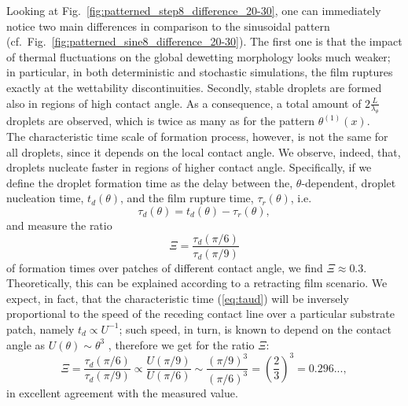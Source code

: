 Looking at Fig.~\ref{fig:patterned_step8_difference_20-30}, one can immediately notice two main differences in comparison to the sinusoidal pattern (cf.~Fig.~\ref{fig:patterned_sine8_difference_20-30}). The first one is that the impact of thermal fluctuations on the 
global dewetting morphology looks much weaker; in particular, in both deterministic and stochastic 
simulations, the film ruptures exactly at the wettability discontinuities.
Secondly, stable droplets are formed also in regions of high contact angle. 
As a consequence, a total amount of $2\frac{L}{\lambda_{\theta}}$ droplets are observed, which is twice as many as for the pattern $\theta^{(1)}(x)$.\\
The characteristic time scale of formation process, however, is not the same for all droplets, 
since it depends on the local contact angle.
We observe, indeed, that, droplets nucleate faster in regions of higher contact angle. 
Specifically, if we define the droplet formation time as the delay between the, $\theta$-dependent, droplet 
nucleation time, $t_d(\theta)$, and the film rupture time, $\tau_r(\theta)$, i.e.
\begin{equation}\label{eq:taud}
\tau_d(\theta) = t_d(\theta) - \tau_r(\theta), 
\end{equation}
and measure the ratio
\begin{equation}\label{eq:time_ratio_delta8_substrate}
    \Xi = \frac{\tau_d(\pi/6)}{\tau_d(\pi/9)} 
\end{equation}
of formation times over patches of different contact angle, we find $\Xi \approx 0.3$.
Theoretically, this can be explained according to a retracting film scenario. We expect, in fact, that 
the characteristic time (\ref{eq:taud}) will be inversely proportional to the speed of the 
receding contact line over a particular substrate patch, namely $t_d \propto U^{-1}$; such speed, in turn,
is known to depend on the contact angle as $U(\theta) \sim \theta^3$ \cite{SnoeijerEggers}, 
therefore we get for the ratio $\Xi$:
\begin{equation}\label{eq:ratio_U_theta_qubed_1/3}
  \Xi = \frac{\tau_d(\pi/6)}{\tau_d(\pi/9)}  \propto  {\frac{U(\pi/9)}{U(\pi/6)} \sim \frac{\left(\pi/9\right)^3}{\left(\pi/6\right)^3} = \left(\frac{2}{3}\right)^3 = 0.296...},
\end{equation}
in excellent agreement with the measured value.\\
